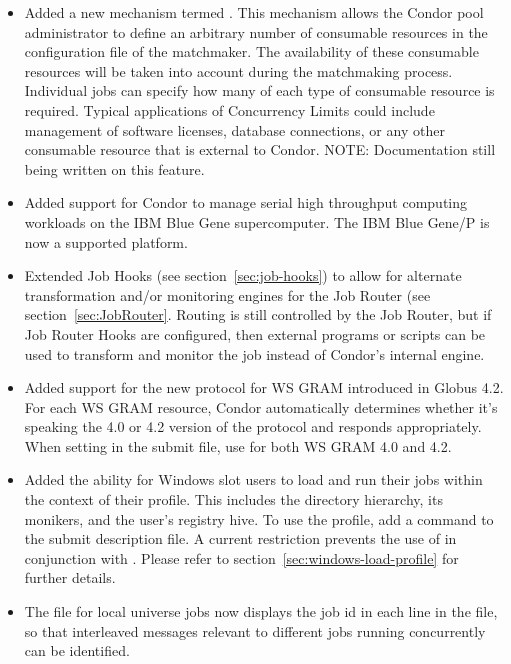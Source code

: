 \begin{itemize}

\item Added a new mechanism termed .  This
	mechanism allows the Condor pool administrator to define an arbitrary
	number of consumable resources in the configuration file of the
	matchmaker.  The availability of these consumable resources will be taken
	into account during the matchmaking process.  Individual jobs can specify
	how many of each type of consumable resource is required.  
	Typical applications of Concurrency Limits could include management of
	software licenses, database connections, or any other consumable resource
	that is external to Condor.  NOTE: Documentation still being written on
	this feature.

\item Added support for Condor to manage serial high throughput computing
	workloads on the IBM Blue Gene supercomputer.  The IBM Blue Gene/P is now
	a supported platform.

\item Extended Job Hooks (see section~\ref{sec:job-hooks}) to allow for
	alternate transformation and/or monitoring engines for the Job Router (see
	section~\ref{sec:JobRouter}.  Routing is still controlled by the Job
	Router, but if Job Router Hooks are configured, then external programs or
	scripts can be used to transform and monitor the job instead of Condor's
	internal engine.

\item Added support for the new protocol for WS GRAM introduced in Globus
4.2. For each WS GRAM resource, Condor automatically determines whether it's
speaking the 4.0 or 4.2 version of the protocol and responds appropriately.
When setting  in the submit file, use
 for both WS GRAM 4.0 and 4.2.

\item Added the ability for Windows slot users to load and run their jobs
within the context of their profile. 
This includes the  directory 
hierarchy, its monikers, and the user's registry hive.
To use the profile, add a  command to the 
submit description file.  A current restriction prevents the use of
in conjunction with . Please refer to 
section~\ref{sec:windows-load-profile} for further details.

\item The  file for local universe jobs now displays the job id
in each line in the file, so that interleaved messages relevant to
different jobs running concurrently can be identified.


\end{itemize}

